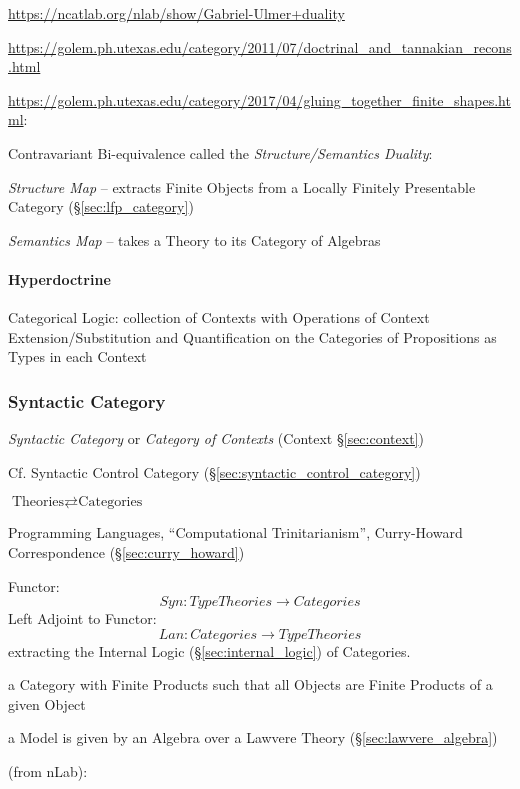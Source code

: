 \url{https://ncatlab.org/nlab/show/Gabriel-Ulmer+duality}

\url{https://golem.ph.utexas.edu/category/2011/07/doctrinal_and_tannakian_recons.html}

\url{https://golem.ph.utexas.edu/category/2017/04/gluing_together_finite_shapes.html}:

Contravariant Bi-equivalence called the \emph{Structure/Semantics
  Duality}:

\emph{Structure Map} -- extracts Finite Objects from a Locally
Finitely Presentable Category (\S\ref{sec:lfp_category})

\emph{Semantics Map} -- takes a Theory to its Category of Algebras



\paragraph{Hyperdoctrine}\label{sec:hyperdoctrine}\hfill

Categorical Logic: collection of Contexts with Operations of Context
Extension/Substitution and Quantification on the Categories of
Propositions as Types in each Context



\subsubsection{Syntactic Category}\label{sec:syntactic_category}

\emph{Syntactic Category} or \emph{Category of Contexts} (Context
\S\ref{sec:context})

\fist Cf. Syntactic Control Category
(\S\ref{sec:syntactic_control_category})

$\text{Theories} \rightleftarrows \text{Categories}$

Programming Languages, ``Computational Trinitarianism'', Curry-Howard
Correspondence (\S\ref{sec:curry_howard})

Functor:
\[
  Syn : TypeTheories \rightarrow Categories
\]
Left Adjoint to Functor:
\[
  Lan : Categories \rightarrow TypeTheories
\]
extracting the Internal Logic (\S\ref{sec:internal_logic}) of
Categories.

a Category with Finite Products such
that all Objects are Finite Products of a given Object %

a Model is given by an Algebra over a Lawvere Theory
(\S\ref{sec:lawvere_algebra})


(from nLab):

